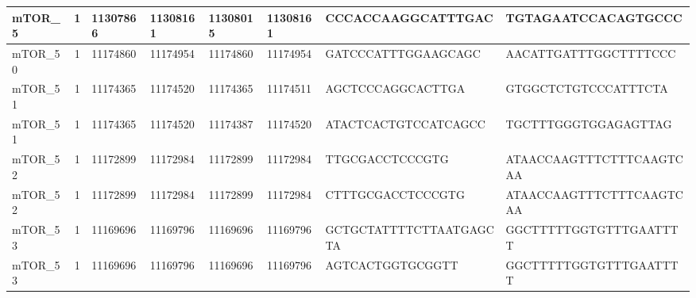 \begin{landscape}
\begin{longtable}{| p{} | p{} | p{} | p{} | p{} | p{} | p{} | p{} |}
\multicolumn{1}{|l|}{mTOR\_5}    & \multicolumn{1}{c|}{1}  & \multicolumn{1}{l|}{11307866}  & \multicolumn{1}{l|}{11308161}  & \multicolumn{1}{l|}{11308015}  & \multicolumn{1}{l|}{11308161}  & \multicolumn{1}{l|}{CCCACCAAGGCATTTGAC}              & \multicolumn{1}{l|}{TGTAGAATCCACAGTGCCC}           \\ \hline
\multicolumn{1}{|l|}{mTOR\_50}   & \multicolumn{1}{c|}{1}  & \multicolumn{1}{l|}{11174860}  & \multicolumn{1}{l|}{11174954}  & \multicolumn{1}{l|}{11174860}  & \multicolumn{1}{l|}{11174954}  & \multicolumn{1}{l|}{GATCCCATTTGGAAGCAGC}             & \multicolumn{1}{l|}{AACATTGATTTGGCTTTTCCC}         \\ \hline
\multicolumn{1}{|l|}{mTOR\_51}   & \multicolumn{1}{c|}{1}  & \multicolumn{1}{l|}{11174365}  & \multicolumn{1}{l|}{11174520}  & \multicolumn{1}{l|}{11174365}  & \multicolumn{1}{l|}{11174511}  & \multicolumn{1}{l|}{AGCTCCCAGGCACTTGA}               & \multicolumn{1}{l|}{GTGGCTCTGTCCCATTTCTA}          \\ \hline
\multicolumn{1}{|l|}{mTOR\_51}   & \multicolumn{1}{c|}{1}  & \multicolumn{1}{l|}{11174365}  & \multicolumn{1}{l|}{11174520}  & \multicolumn{1}{l|}{11174387}  & \multicolumn{1}{l|}{11174520}  & \multicolumn{1}{l|}{ATACTCACTGTCCATCAGCC}            & \multicolumn{1}{l|}{TGCTTTGGGTGGAGAGTTAG}          \\ \hline
\multicolumn{1}{|l|}{mTOR\_52}   & \multicolumn{1}{c|}{1}  & \multicolumn{1}{l|}{11172899}  & \multicolumn{1}{l|}{11172984}  & \multicolumn{1}{l|}{11172899}  & \multicolumn{1}{l|}{11172984}  & \multicolumn{1}{l|}{TTGCGACCTCCCGTG}                 & \multicolumn{1}{l|}{ATAACCAAGTTTCTTTCAAGTCAA}      \\ \hline
\multicolumn{1}{|l|}{mTOR\_52}   & \multicolumn{1}{c|}{1}  & \multicolumn{1}{l|}{11172899}  & \multicolumn{1}{l|}{11172984}  & \multicolumn{1}{l|}{11172899}  & \multicolumn{1}{l|}{11172984}  & \multicolumn{1}{l|}{CTTTGCGACCTCCCGTG}               & \multicolumn{1}{l|}{ATAACCAAGTTTCTTTCAAGTCAA}      \\ \hline
\multicolumn{1}{|l|}{mTOR\_53}   & \multicolumn{1}{c|}{1}  & \multicolumn{1}{l|}{11169696}  & \multicolumn{1}{l|}{11169796}  & \multicolumn{1}{l|}{11169696}  & \multicolumn{1}{l|}{11169796}  & \multicolumn{1}{l|}{GCTGCTATTTTCTTAATGAGCTA}         & \multicolumn{1}{l|}{GGCTTTTTGGTGTTTGAATTTT}        \\ \hline
\multicolumn{1}{|l|}{mTOR\_53}   & \multicolumn{1}{c|}{1}  & \multicolumn{1}{l|}{11169696}  & \multicolumn{1}{l|}{11169796}  & \multicolumn{1}{l|}{11169696}  & \multicolumn{1}{l|}{11169796}  & \multicolumn{1}{l|}{AGTCACTGGTGCGGTT}                & \multicolumn{1}{l|}{GGCTTTTTGGTGTTTGAATTTT}        \\ \hline

\end{longtable}
\end{landscape}
